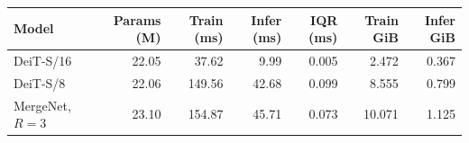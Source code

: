 \begin{tabular}{lrrrrrr}
\toprule
Model & Params (M) & Train (ms) & Infer (ms) & IQR (ms) & Train GiB & Infer GiB \\
\midrule
DeiT-S/16 & 22.05 & 37.62 & 9.99 & 0.005 & 2.472 & 0.367 \\
DeiT-S/8 & 22.06 & 149.56 & 42.68 & 0.099 & 8.555 & 0.799 \\
MergeNet, $R=3$ & 23.10 & 154.87 & 45.71 & 0.073 & 10.071 & 1.125 \\
\bottomrule
\end{tabular}
